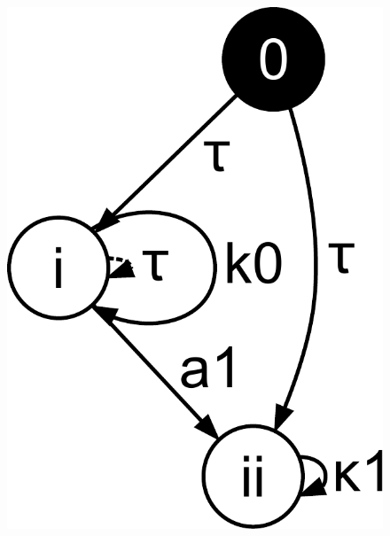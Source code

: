 \begin{figure}[hbt]
  \begin{minipage}[b]{4cm}
    \centering
    \includegraphics[scale=0.2]{prop-pres-case-studies/figs/broadcast-rule1-lhs}
  \end{minipage}
  \hfill
  \begin{minipage}[b]{4cm}
    \centering

\end{minipage}
\end{figure}
